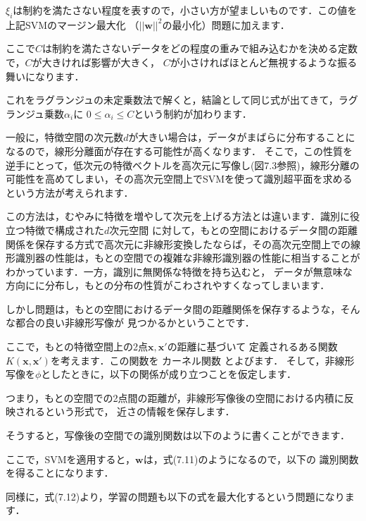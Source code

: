 $\xi_i$は制約を満たさない程度を表すので，小さい方が望ましいものです．この値を上記SVMのマージン最大化
（$|| \bm{w} ||^2$の最小化）問題に加えます．


ここで$C$は制約を満たさないデータをどの程度の重みで組み込むかを決める定数で，$C$が大きければ影響が大きく，
$C$が小さければほとんど無視するような振る舞いになります．


これをラグランジュの未定乗数法で解くと，結論として同じ式が出てきて，ラグランジュ乗数$\alpha_i$に
$0 \le \alpha_i \le C$という制約が加わります．


一般に，特徴空間の次元数$d$が大きい場合は，データがまばらに分布することになるので，線形分離面が存在する可能性が高くなります．
そこで，この性質を逆手にとって，低次元の特徴ベクトルを高次元に写像し(図7.3参照)，線形分離の可能性を高めてしまい，その高次元空間上でSVMを使って識別超平面を求めるという方法が考えられます．

この方法は，むやみに特徴を増やして次元を上げる方法とは違います．識別に役立つ特徴で構成された$d$次元空間
に対して，もとの空間におけるデータ間の距離関係を保存する方式で高次元に非線形変換したならば，その高次元空間上での線形識別器の性能は，もとの空間での複雑な非線形識別器の性能に相当することがわかっています．一方，識別に無関係な特徴を持ち込むと，
データが無意味な方向にに分布し，もとの分布の性質がこわされやすくなってしまいます．

しかし問題は，もとの空間におけるデータ間の距離関係を保存するような，そんな都合の良い非線形写像が
見つかるかということです．


ここで，もとの特徴空間上の2点$\bm{x}, \bm{x}'$の距離に基づいて
定義されるある関数$K(\bm{x}, \bm{x}')$を考えます．この関数を
カーネル関数
とよびます．
そして，非線形写像を$\phi$としたときに，以下の関係が成り立つことを仮定します．

つまり，もとの空間での2点間の距離が，非線形写像後の空間における内積に反映されるという形式で，
近さの情報を保存します．


そうすると，写像後の空間での識別関数は以下のように書くことができます．

ここで，SVMを適用すると，$\bm{w}$は，式(7.11)のようになるので，以下の
識別関数を得ることになります．

同様に，式(7.12)より，学習の問題も以下の式を最大化するという問題になります．

